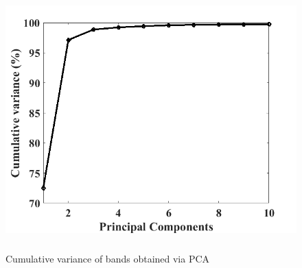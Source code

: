 \documentclass[document.tex]{subfiles}
\begin{document}
\begin{figure}[H]
	\begin{center}
		\includegraphics[height=10.0cm]{imgs/Var.png}
	\end{center}
	\caption{Cumulative variance of bands obtained via PCA}
	\label{fig:Cumulative variance of bands obtained via PCA}
\end{figure}
\end{document}
